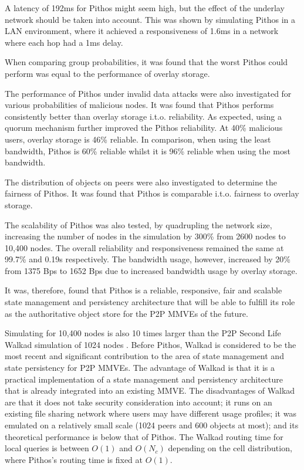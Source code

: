 A latency of 192ms for Pithos might seem high, but the effect of the underlay network should be taken into account. This was shown by simulating Pithos in a LAN environment, where it achieved a responsiveness of 1.6ms in a network where each hop had a 1ms delay.

When comparing group probabilities, it was found that the worst Pithos could perform was equal to the performance of overlay storage.

The performance of Pithos under invalid data attacks were also investigated for various probabilities of malicious nodes. It was found that Pithos performs consistently better than overlay storage i.t.o. reliability. As expected, using a quorum mechanism further improved the Pithos reliability. At 40\% malicious users, overlay storage is 46\% reliable. In comparison, when using the least bandwidth, Pithos is 60\% reliable whilst it is 96\% reliable when using the most bandwidth.

The distribution of objects on peers were also investigated to determine the fairness of Pithos. It was found that Pithos is comparable i.t.o. fairness to overlay storage.

The scalability of Pithos was also tested, by quadrupling the network size, increasing the number of nodes in the simulation by 300\% from 2600 nodes to 10,400 nodes. The overall reliability and responsiveness remained the same at 99.7\% and 0.19s respectively. The bandwidth usage, however, increased by 20\% from 1375 Bps to 1652 Bps due to increased bandwidth usage by overlay storage.

It was, therefore, found that Pithos is a reliable, responsive, fair and scalable state management and persistency architecture that will be able to fulfill its role as the authoritative object store for the P2P MMVEs of the future.

Simulating for 10,400 nodes is also 10 times larger than the P2P Second Life Walkad simulation of 1024 nodes \cite{Walkad_Varvello}. Before Pithos, Walkad is considered to be the most recent and significant contribution to the area of state management and state persistency for P2P MMVEs. The advantage of Walkad is that it is a practical implementation of a state management and persistency architecture that is already integrated into an existing MMVE. The disadvantages of Walkad are that it does not take security consideration into account; it runs on an existing file sharing network where users may have different usage profiles; it was emulated on a relatively small scale (1024 peers and 600 objects at most); and its theoretical performance is below that of Pithos. The Walkad routing time for local queries is between $O(1)$ and $O(N_c)$ depending on the cell distribution, where Pithos's routing time is fixed at $O(1)$.


